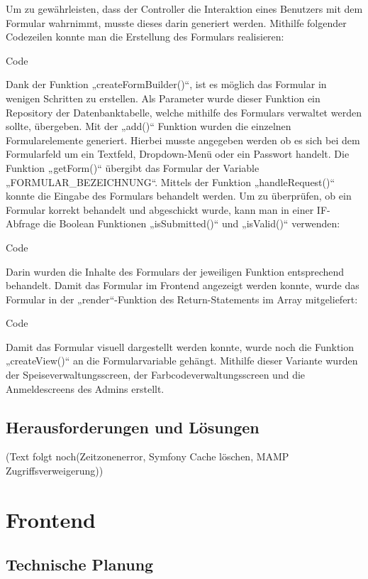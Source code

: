 	Um zu gewährleisten, dass der Controller die Interaktion eines Benutzers mit dem Formular wahrnimmt, musste dieses darin generiert werden. Mithilfe folgender Codezeilen konnte man die Erstellung des Formulars realisieren:
	
	Code
	
	Dank der Funktion „createFormBuilder()“, ist es möglich das Formular in wenigen Schritten zu erstellen. Als Parameter wurde dieser Funktion ein Repository der Datenbanktabelle, welche mithilfe des Formulars verwaltet werden sollte, übergeben. Mit der „add()“ Funktion wurden die einzelnen Formularelemente generiert. Hierbei musste angegeben werden ob es sich bei dem Formularfeld um ein Textfeld, Dropdown-Menü oder ein Passwort handelt. Die Funktion „getForm()“ übergibt das Formular der Variable „FORMULAR\_BEZEICHNUNG“.
	Mittels der Funktion „handleRequest()“ konnte die Eingabe des Formulars behandelt werden. Um zu überprüfen, ob ein Formular korrekt behandelt und abgeschickt wurde, kann man in einer IF-Abfrage die Boolean Funktionen „isSubmitted()“ und „isValid()“ verwenden:
	
	Code
	
	Darin wurden die Inhalte des Formulars der jeweiligen Funktion entsprechend behandelt.
	Damit das Formular im Frontend angezeigt werden konnte, wurde das Formular in der „render“-Funktion des Return-Statements im Array mitgeliefert:
	
	Code
	
	Damit das Formular visuell dargestellt werden konnte, wurde noch die Funktion „createView()“ an die Formularvariable gehängt.
	Mithilfe dieser Variante wurden der Speiseverwaltungsscreen, der Farbcodeverwaltungsscreen und die Anmeldescreens des Admins erstellt.

  \subsection{Herausforderungen und Lösungen}

	(Text folgt noch(Zeitzonenerror, Symfony Cache löschen, MAMP Zugriffsverweigerung))

\section{Frontend}

  \subsection{Technische Planung}

